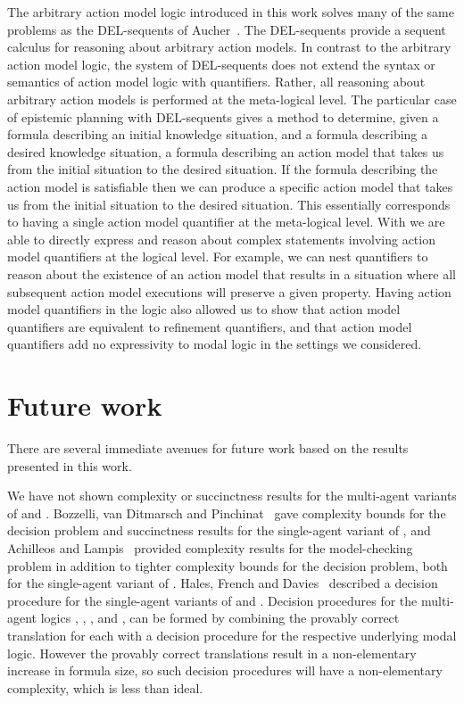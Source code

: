 The arbitrary action model logic introduced in this work solves many of the same problems as the DEL-sequents of Aucher~\cite{aucher:2011,aucher:2012}.
The DEL-sequents provide a sequent calculus for reasoning about arbitrary action models.
In contrast to the arbitrary action model logic, the system of DEL-sequents does not extend the syntax or semantics of action model logic with quantifiers.
Rather, all reasoning about arbitrary action models is performed at the meta-logical level.
The particular case of epistemic planning with DEL-sequents gives a method to determine, given a formula describing an initial knowledge situation, and a formula describing a desired knowledge situation, a formula describing an action model that takes us from the initial situation to the desired situation.
If the formula describing the action model is satisfiable then we can produce a specific action model that takes us from the initial situation to the desired situation.
This essentially corresponds to having a single action model quantifier at the meta-logical level.
With \logicAaml{} we are able to directly express and reason about complex statements involving action model quantifiers at the logical level.
For example, we can nest quantifiers to reason about the existence of an action model that results in a situation where all subsequent action model executions will preserve a given property.
Having action model quantifiers in the logic also allowed us to show that action model quantifiers are equivalent to refinement quantifiers, and that action model quantifiers add no expressivity to modal logic in the settings we considered.

\section{Future work}

There are several immediate avenues for future work based on the results presented in this work.

We have not shown complexity or succinctness results for the multi-agent variants of \logicRml{} and \logicAaml{}.
Bozzelli, van Ditmarsch and Pinchinat~\cite{bozzelli:2014a} gave complexity bounds for the decision problem and succinctness results for the single-agent variant of \logicRmlK{}, and Achilleos and Lampis~\cite{achilleos:2013} provided complexity results for the model-checking problem in addition to tighter complexity bounds for the decision problem, both for the single-agent variant of \logicRmlK{}.
Hales, French and Davies~\cite{hales:2011b} described a decision procedure for the single-agent variants of \logicRmlKD{} and \logicRmlS{}.
Decision procedures for the multi-agent logics \logicRmlK{}, \logicRmlKFF{}, \logicRmlKD{}, and \logicRmlS{}, can be formed by combining the provably correct translation for each with a decision procedure for the respective underlying modal logic.
However the provably correct translations result in a non-elementary increase in formula size, so such decision procedures will have a non-elementary complexity, which is less than ideal.

